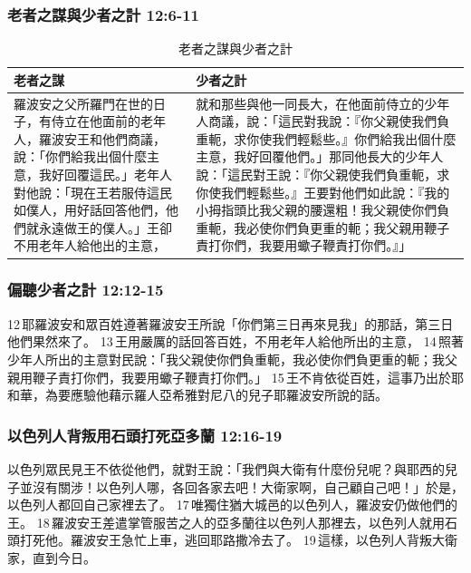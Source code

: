 \subsubsection{老者之謀與少者之計 12:6-11}
\begin{table}[H]
\centering 
\begin{tabular}{p{6.5cm}|p{10.5cm}}\hline\hline
老者之謀&少者之計\\\hline
羅波安之父所羅門在世的日子，有侍立在他面前的老年人，羅波安王和他們商議，說：「你們給我出個什麼主意，我好回覆這民。」老年人對他說：「現在王若服侍這民如僕人，用好話回答他們，他們就永遠做王的僕人。」王卻不用老年人給他出的主意，&就和那些與他一同長大，在他面前侍立的少年人商議，說：「這民對我說：『你父親使我們負重軛，求你使我們輕鬆些。』你們給我出個什麼主意，我好回覆他們。」那同他長大的少年人說：「這民對王說：『你父親使我們負重軛，求你使我們輕鬆些。』王要對他們如此說：『我的小拇指頭比我父親的腰還粗！我父親使你們負重軛，我必使你們負更重的軛；我父親用鞭子責打你們，我要用蠍子鞭責打你們。』」\\\hline
\end{tabular}
\caption{老者之謀與少者之計}
\end{table}



\subsubsection{偏聽少者之計 12:12-15}


12 耶羅波安和眾百姓遵著羅波安王所說「你們第三日再來見我」的那話，第三日他們果然來了。 13 王用嚴厲的話回答百姓，不用老年人給他所出的主意， 14 照著少年人所出的主意對民說：「我父親使你們負重軛，我必使你們負更重的軛；我父親用鞭子責打你們，我要用蠍子鞭責打你們。」 15 王不肯依從百姓，這事乃出於耶和華，為要應驗他藉示羅人亞希雅對尼八的兒子耶羅波安所說的話。



 
\subsubsection{以色列人背叛用石頭打死亞多蘭 12:16-19}
以色列眾民見王不依從他們，就對王說：「我們與大衛有什麼份兒呢？與耶西的兒子並沒有關涉！以色列人哪，各回各家去吧！大衛家啊，自己顧自己吧！」於是，以色列人都回自己家裡去了。 17 唯獨住猶大城邑的以色列人，羅波安仍做他們的王。 18 羅波安王差遣掌管服苦之人的亞多蘭往以色列人那裡去，以色列人就用石頭打死他。羅波安王急忙上車，逃回耶路撒冷去了。 19 這樣，以色列人背叛大衛家，直到今日。


